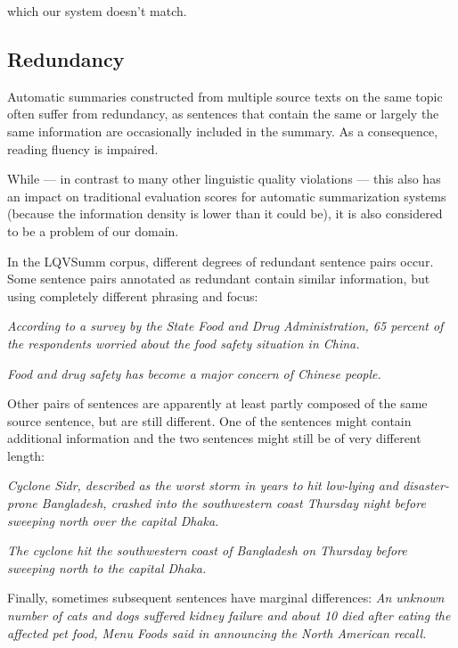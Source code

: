 \documentclass[a4paper,10pt]{scrartcl}
\theoremstyle{style}
\begin{document}
which our system doesn't match.

\subsection{Redundancy}
\label{redundancy}

Automatic summaries constructed from multiple source texts on the same topic often suffer from redundancy, as sentences that contain the same or largely the same information are occasionally included in the summary. As a consequence, reading fluency is impaired.

While --- in contrast to many other linguistic quality violations --- this also has an impact on traditional evaluation scores for automatic summarization systems (because the information density is lower than it could be), it is also considered to be a problem of our domain.

In the LQVSumm corpus, different degrees of redundant sentence pairs occur. Some sentence pairs annotated as redundant contain similar information, but using completely different phrasing and focus:

\textit{According to a survey by the State Food and Drug Administration, 65 percent of the respondents worried about the food safety situation in China.}

\textit{Food and drug safety has become a major concern of Chinese people.}

Other pairs of sentences are apparently at least partly composed of the same source sentence, but are still different. One of the sentences might contain additional information and the two sentences might still be of very different length:

\textit{Cyclone Sidr, described as the worst storm in years to hit low-lying and disaster-prone Bangladesh, crashed into the southwestern coast Thursday night before sweeping north over the capital Dhaka.}

\textit{The cyclone hit the southwestern coast of Bangladesh on Thursday before sweeping north to the capital Dhaka.}

Finally, sometimes subsequent sentences have marginal differences:
\textit{An unknown number of cats and dogs suffered kidney failure and about 10 died after eating the affected pet food, Menu Foods said in announcing the North American recall.}
\end{document}
